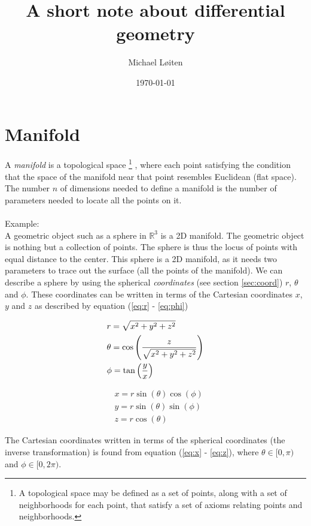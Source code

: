 \documentclass[a4paper, 12pt]{article}
\title{\vspace{-8ex}A short note about differential geometry\vspace{-1ex}}
\author{Michael L{\o}iten}
\date{\vspace{-2ex}\today}
\begin{document}
\maketitle

\section{Manifold}
A \emph{manifold} is a topological space%
\footnote{A topological space may be defined as a set of points, along with a 
          set of neighborhoods for each point, that satisfy a set of axioms 
          relating points and neighborhoods.}%
, where each point satisfying the condition that the space of the manifold near 
that point resembles Euclidean (flat space). The number $n$ of dimensions needed 
to define a manifold is the number of parameters needed to locate all the points 
on it.\\
\\
Example:\\
A geometric object such as a sphere in $\mathbb{R}^3$ is a 2D manifold. The 
geometric object is nothing but a collection of points. The sphere is thus the 
locus of points with equal distance to the center. This sphere is a 2D 
manifold, as it needs two parameters to trace out the surface (all the points of 
the manifold). We can describe a sphere by using the spherical 
\emph{coordinates} (see section \ref{sec:coord}) $r$, $\theta$ and $\phi$. These 
coordinates can be written in terms of the Cartesian coordinates $x$, $y$ and 
$z$ as described by equation (\ref{eq:r} - \ref{eq:phi})

\begin{minipage}{0.49\textwidth}
 \begin{align}
 &r = \sqrt{x^2+y^2+z^2} \label{eq:r}\\
 &\theta = \cos\left(\frac{z}{\sqrt{x^2+y^2+z^2}}\right) \label{eq:theta}\\
 &\phi = \tan\left(\frac{y}{x}\right) \label{eq:phi}
 \end{align}
\end{minipage}
\begin{minipage}{0.49\textwidth}
 \begin{align}
 &x = r\sin(\theta)\cos(\phi) \label{eq:x}\\
 &y = r\sin(\theta)\sin(\phi) \label{eq:y}\\
 &z = r\cos(\theta) \label{eq:z}
 \end{align} 
\end{minipage}
%
The Cartesian coordinates written in terms of the spherical coordinates (the 
inverse transformation) is found from equation (\ref{eq:x} - \ref{eq:z}),
where $\theta \in [0,\pi)$ and $\phi \in [0,2\pi)$.
\end{document}
